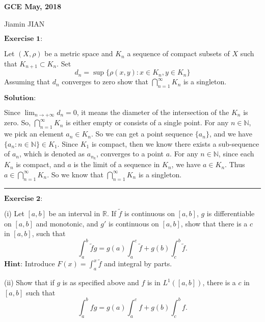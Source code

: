 \documentclass[12pt,a4paper]{ctexart}
\begin{document}
\begin{center}
\textbf{ GCE May, 2018}
\vspace{8pt}

Jiamin JIAN
\end{center}

\vspace{12pt}

$\textbf{Exercise 1:}$

Let $(X, \rho)$ be a metric space and $K_{n}$ a sequence of compact subsets of $X$ such that $K_{n+1} \subset K_{n}$. Set
\begin{equation*}
   d_{n} = \sup \{ \rho (x, y): x \in K_{n}, y \in K_{n} \}
\end{equation*}
Assuming that $d_{n}$ converges to zero show that $\bigcap_{n = 1}^{\infty} K_{n}$ is a singleton.

\vspace{8pt}

$\textbf{Solution:}$

Since $\lim_{n \to + \infty} d_{n} = 0$, it means the diameter of the intersection of the $K_{n}$ is zero. So, $\bigcap_{n = 1}^{\infty} K_{n}$ is either empty or consists of a single point. For any $n \in \mathbb{N}$, we pick an element $a_{n} \in K_{n}$. So we can get a point sequence $\{a_{n}\}$, and we have $\{a_{n}: n \in \mathbb{N}\} \in K_{1}$. Since $K_{1}$ is compact, then we know there exists a sub-sequence of $a_{n}$, which is denoted as $a_{n_{k}}$, converges to a point $a$. For any $n \in \mathbb{N}$, since each $K_{n}$ is compact, and $a$ is the limit of a sequence in $K_{n}$, we have $a \in K_{n}$. Thus $a \in \bigcap_{n = 1}^{\infty} K_{n}$. So we know that $\bigcap_{n = 1}^{\infty} K_{n}$ is a singleton.

\noindent\rule[0.25\baselineskip]{\textwidth}{0.5pt}

\vspace{8pt}
$\textbf{Exercise 2:}$

(i) Let $[a, b]$ be an interval in $\mathbb{R}$. If $\tilde{f}$ is continuous on $[a, b]$, $g$ is differentiable on $[a, b]$ and monotonic, and $g'$ is continuous on $[a, b]$, show that there is a $c$ in $[a, b]$, such that
\begin{equation*}
   \int_{a}^{b} \tilde{f}g = g(a) \int_{a}^{c} \tilde{f} + g(b) \int_{c}^{b} \tilde{f}.
\end{equation*}
$\textbf{Hint:}$ Introduce $F(x) = \int_{a}^{x} \tilde{f}$ and integral by parts.

(ii) Show that if $g$ is as specified above and $f$ is in $L^{1} ([a, b])$, there is a $c$ in $[a, b]$ such that 
\begin{equation*}
   \int_{a}^{b} f g = g(a) \int_{a}^{c} f + g(b) \int_{c}^{b} f.
\end{equation*}
\end{document}
